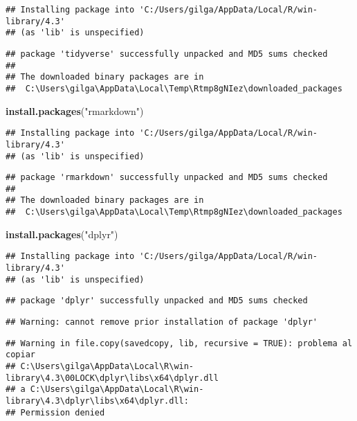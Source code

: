 \documentclass[
]{article}
\newenvironment{Shaded}{\begin{snugshade}}{\end{snugshade}}
\newcommand{\FunctionTok}[1]{\textcolor[rgb]{0.13,0.29,0.53}{\textbf{#1}}}
\newcommand{\NormalTok}[1]{#1}
\newcommand{\StringTok}[1]{\textcolor[rgb]{0.31,0.60,0.02}{#1}}
\begin{document}
\begin{verbatim}
## Installing package into 'C:/Users/gilga/AppData/Local/R/win-library/4.3'
## (as 'lib' is unspecified)
\end{verbatim}

\begin{verbatim}
## package 'tidyverse' successfully unpacked and MD5 sums checked
## 
## The downloaded binary packages are in
##  C:\Users\gilga\AppData\Local\Temp\Rtmp8gNIez\downloaded_packages
\end{verbatim}

\begin{Shaded}
\begin{Highlighting}[]
\FunctionTok{install.packages}\NormalTok{(}\StringTok{"rmarkdown"}\NormalTok{)}
\end{Highlighting}
\end{Shaded}

\begin{verbatim}
## Installing package into 'C:/Users/gilga/AppData/Local/R/win-library/4.3'
## (as 'lib' is unspecified)
\end{verbatim}

\begin{verbatim}
## package 'rmarkdown' successfully unpacked and MD5 sums checked
## 
## The downloaded binary packages are in
##  C:\Users\gilga\AppData\Local\Temp\Rtmp8gNIez\downloaded_packages
\end{verbatim}

\begin{Shaded}
\begin{Highlighting}[]
\FunctionTok{install.packages}\NormalTok{(}\StringTok{"dplyr"}\NormalTok{)}
\end{Highlighting}
\end{Shaded}

\begin{verbatim}
## Installing package into 'C:/Users/gilga/AppData/Local/R/win-library/4.3'
## (as 'lib' is unspecified)
\end{verbatim}

\begin{verbatim}
## package 'dplyr' successfully unpacked and MD5 sums checked
\end{verbatim}

\begin{verbatim}
## Warning: cannot remove prior installation of package 'dplyr'
\end{verbatim}

\begin{verbatim}
## Warning in file.copy(savedcopy, lib, recursive = TRUE): problema al copiar
## C:\Users\gilga\AppData\Local\R\win-library\4.3\00LOCK\dplyr\libs\x64\dplyr.dll
## a C:\Users\gilga\AppData\Local\R\win-library\4.3\dplyr\libs\x64\dplyr.dll:
## Permission denied
\end{verbatim}
\end{document}

